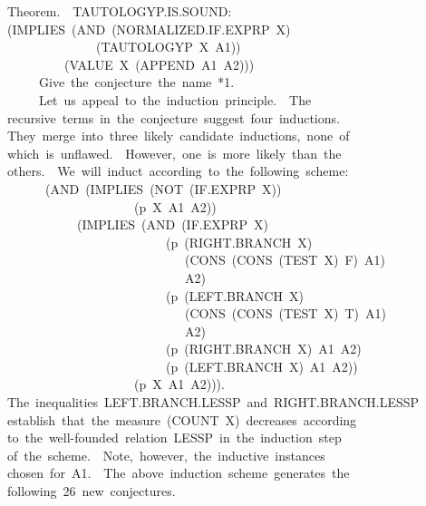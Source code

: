 \documentclass[11pt]{book}
\newenvironment{pubasis}{\begin{flushleft}\ttfamily\small}{\normalsize\rmfamily\end{flushleft}}
\begin{document}
\begin{pubasis}
Theorem.~~TAU\-TOL\-OGYP.IS.SOUND:\\
(IMPLIES~(AND~(NOR\-MAL\-IZED.IF.EXPRP~X)\\
~~~~~~~~~~~~~~(TAUTOLOGYP~X~A1))\\
~~~~~~~~~(VALUE~X~(APPEND~A1~A2)))\\

~~~~~Give~the~conjecture~the~name~*1.\\

~~~~~Let~us~appeal~to~the~induction~principle.~~The\\
recursive~terms~in~the~conjecture~suggest~four~inductions.\\
They~merge~into~three~likely~candidate~inductions,~none~of\\
which~is~unflawed.~~However,~one~is~more~likely~than~the\\
others.~~We~will~induct~according~to~the~following~scheme:\\
~~~~~~(AND~(IMPLIES~(NOT~(IF.EXPRP~X))\\
~~~~~~~~~~~~~~~~~~~~(p~X~A1~A2))\\
~~~~~~~~~~~(IMPLIES~(AND~(IF.EXPRP~X)\\
~~~~~~~~~~~~~~~~~~~~~~~~~(p~(RIGHT.BRANCH~X)\\
~~~~~~~~~~~~~~~~~~~~~~~~~~~~(CONS~(CONS~(TEST~X)~F)~A1)\\
~~~~~~~~~~~~~~~~~~~~~~~~~~~~A2)\\
~~~~~~~~~~~~~~~~~~~~~~~~~(p~(LEFT.BRANCH~X)\\
~~~~~~~~~~~~~~~~~~~~~~~~~~~~(CONS~(CONS~(TEST~X)~T)~A1)\\
~~~~~~~~~~~~~~~~~~~~~~~~~~~~A2)\\
~~~~~~~~~~~~~~~~~~~~~~~~~(p~(RIGHT.BRANCH~X)~A1~A2)\\
~~~~~~~~~~~~~~~~~~~~~~~~~(p~(LEFT.BRANCH~X)~A1~A2))\\
~~~~~~~~~~~~~~~~~~~~(p~X~A1~A2))).\\
The~inequalities~LEFT.BRANCH.LESSP~and~RIGHT.BRANCH.LESSP\\
establish~that~the~measure~(COUNT~X)~decreases~according\\
to~the~well-founded~relation~LESSP~in~the~induction~step\\
of~the~scheme.~~Note,~however,~the~inductive~instances\\
chosen~for~A1.~~The~above~induction~scheme~generates~the\\
following~26~new~conjectures.\\
\end{pubasis}
\end{document}

